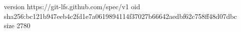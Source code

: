 version https://git-lfs.github.com/spec/v1
oid sha256:bc121b947eeb4c2fd1e7a0619894114f37027b66642aedbf62c758ff48d07dbc
size 2780
